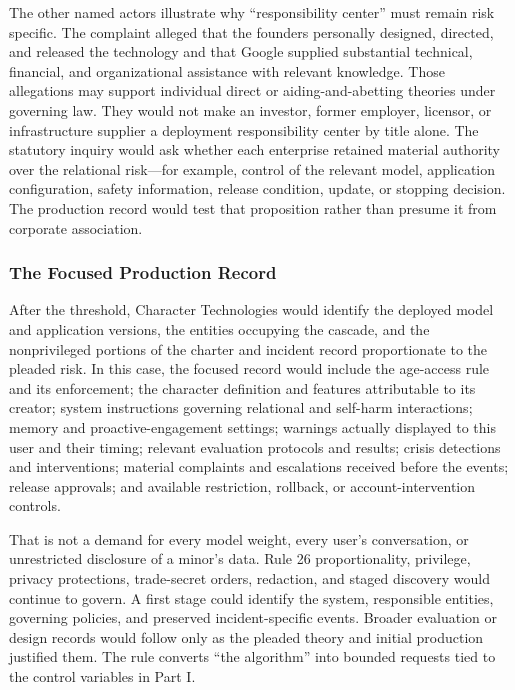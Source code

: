 The other named actors illustrate why ``responsibility center'' must remain risk specific. The complaint alleged that the founders personally designed, directed, and released the technology and that Google supplied substantial technical, financial, and organizational assistance with relevant knowledge. Those allegations may support individual direct or aiding-and-abetting theories under governing law. They would not make an investor, former employer, licensor, or infrastructure supplier a deployment responsibility center by title alone. The statutory inquiry would ask whether each enterprise retained material authority over the relational risk---for example, control of the relevant model, application configuration, safety information, release condition, update, or stopping decision. The production record would test that proposition rather than presume it from corporate association.

\subsubsection{The Focused Production Record}

After the threshold, Character Technologies would identify the deployed model and application versions, the entities occupying the cascade, and the nonprivileged portions of the charter and incident record proportionate to the pleaded risk. In this case, the focused record would include the age-access rule and its enforcement; the character definition and features attributable to its creator; system instructions governing relational and self-harm interactions; memory and proactive-engagement settings; warnings actually displayed to this user and their timing; relevant evaluation protocols and results; crisis detections and interventions; material complaints and escalations received before the events; release approvals; and available restriction, rollback, or account-intervention controls.

That is not a demand for every model weight, every user's conversation, or unrestricted disclosure of a minor's data. Rule 26 proportionality, privilege, privacy protections, trade-secret orders, redaction, and staged discovery would continue to govern. A first stage could identify the system, responsible entities, governing policies, and preserved incident-specific events. Broader evaluation or design records would follow only as the pleaded theory and initial production justified them. The rule converts ``the algorithm'' into bounded requests tied to the control variables in Part I.

